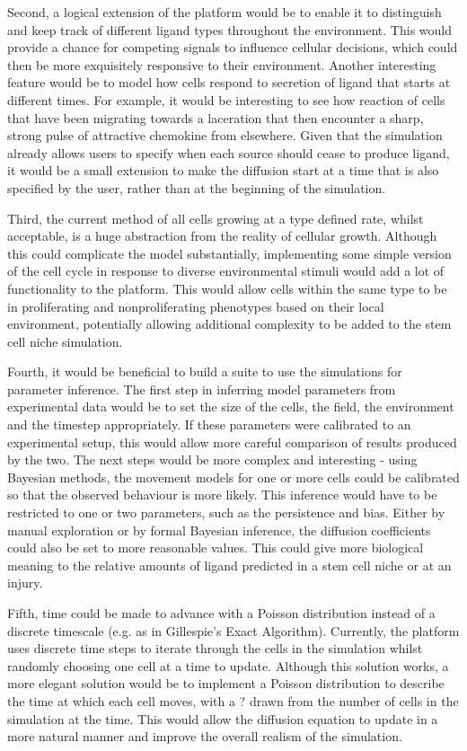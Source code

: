 \documentclass[11.5pt]{article}
\begin{document}
Second, a logical extension of the platform would be to enable it to 
distinguish and keep track of different ligand types throughout the 
environment. This would provide a chance for competing signals to 
influence cellular decisions, which could then be more exquisitely 
responsive to their environment. Another interesting feature would be to 
model how cells respond to secretion of ligand that starts at different 
times. For example, it would be interesting to see how reaction of cells 
that have been migrating towards a laceration that then encounter a 
sharp, strong pulse of attractive chemokine from elsewhere. Given that 
the simulation already allows users to specify when each source should 
cease to produce ligand, it would be a small extension to make the 
diffusion start at a time that is also specified by the user, rather 
than at the beginning of the simulation. 



Third, the current method of all cells growing at a type defined rate, 
whilst acceptable, is a huge abstraction from the reality of cellular 
growth. Although this could complicate the model substantially, 
implementing some simple version of the cell cycle in response to 
diverse environmental stimuli would add a lot of functionality to the 
platform. This would allow cells within the same type to be in 
proliferating and nonproliferating phenotypes based on their local 
environment, potentially allowing additional complexity to be added to 
the stem cell niche simulation.

Fourth, it would be beneficial to build a suite to use the simulations 
for parameter inference. The first step in inferring model parameters 
from experimental data would be to set the size of the cells, the field, 
the environment and the timestep appropriately. If these parameters were 
calibrated to an experimental setup, this would allow more careful 
comparison of results produced by the two. The next steps would be more 
complex and interesting - using Bayesian methods, the movement models 
for one or more cells could be calibrated so that the observed behaviour 
is more likely. This inference would have to be restricted to one or two 
parameters, such as the persistence and bias. Either by manual 
exploration or by formal Bayesian inference, the diffusion coefficients 
could also be set to more reasonable values. This could give more 
biological meaning to the relative amounts of ligand predicted in a stem 
cell niche or at an injury.

Fifth, time could be made to advance with a Poisson distribution instead 
of a discrete timescale (e.g. as in Gillespie's Exact Algorithm). 
Currently, the platform uses discrete time steps to iterate through the 
cells in the simulation whilst randomly choosing one cell at a time to 
update. Although this solution works, a more elegant solution would be 
to implement a Poisson distribution to describe the time at which each 
cell moves, with a ? drawn from the number of cells in the simulation at 
the time. This would allow the diffusion equation to update in a more 
natural manner and improve the overall realism of the simulation.
\end{document}
